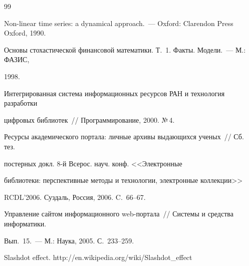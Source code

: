 {\begin{thebibliography}{99}




Non-linear time series: a dynamical approach.~--- Oxford: Clarendon Press Oxford, 1990.









Основы стохастической финансовой математики. Т.~1. Факты. Модели.~--- М.: ФАЗИС, 


1998.









Интегрированная система информационных ресурсов РАН и технология разработки 


цифровых библиотек~// Программирование, 2000. №\,4.









Ресурсы академического портала: личные архивы выдающихся ученых~// Сб. тез. 


постерных докл. 8-й Всерос. науч. конф. <<Электронные 


библиотеки: перспективные методы и технологии, электронные коллекции>> 


RCDL'2006. Суздаль, Россия, 2006. C.~66--67.









Управ\-ле\-ние сайтом информационного web-портала~// Системы и средства информатики. 


Вып.~15.~--- М.: Наука, 2005. С.~233--259.







Slashdot effect. {\sf http://en.wikipedia.org/wiki/Slashdot\_effect}


\end{thebibliography}


}


